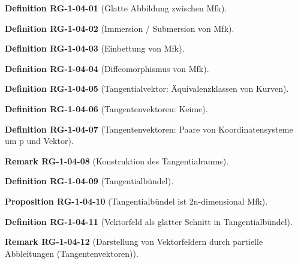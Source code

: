 \documentclass[10pt, letterpaper]{article}
\newcommand{\CustomHeading}[3]{%
  \par\medskip\noindent%
  \textbf{#1 #2} \textnormal{(#3)}.\enskip%
}
\newenvironment{DEF}[2]{\CustomHeading{Definition}{#1}{#2}}{}
\newenvironment{PROP}[2]{\CustomHeading{Proposition}{#1}{#2}}{}
\newenvironment{REM}[2]{\CustomHeading{Remark}{#1}{#2}}{}
\begin{document}
\begin{DEF}{RG-1-04-01}{Glatte Abbildung zwischen Mfk}
\end{DEF}

\begin{DEF}{RG-1-04-02}{Immersion / Submersion von Mfk}
\end{DEF}

\begin{DEF}{RG-1-04-03}{Einbettung von Mfk}
\end{DEF}

\begin{DEF}{RG-1-04-04}{Diffeomorphismus von Mfk}
\end{DEF}

\begin{DEF}{RG-1-04-05}{Tangentialvektor: Äquivalenzklassen von Kurven}
\end{DEF}

\begin{DEF}{RG-1-04-06}{Tangentenvektoren: Keime}
\end{DEF}

\begin{DEF}{RG-1-04-07}{Tangentenvektoren: Paare von Koordinatensysteme um p und Vektor}
\end{DEF}

\begin{REM}{RG-1-04-08}{Konstruktion des Tangentialraums}
\end{REM}

\begin{DEF}{RG-1-04-09}{Tangentialbündel}
\end{DEF}

\begin{PROP}{RG-1-04-10}{Tangentialbündel ist 2n-dimensional Mfk}
\end{PROP}

\begin{DEF}{RG-1-04-11}{Vektorfeld als glatter Schnitt in Tangentialbündel}
\end{DEF}

\begin{REM}{RG-1-04-12}{Darstellung von Vektorfeldern durch partielle Abbleitungen (Tangentenvektoren)}
\end{REM}
\end{document}
